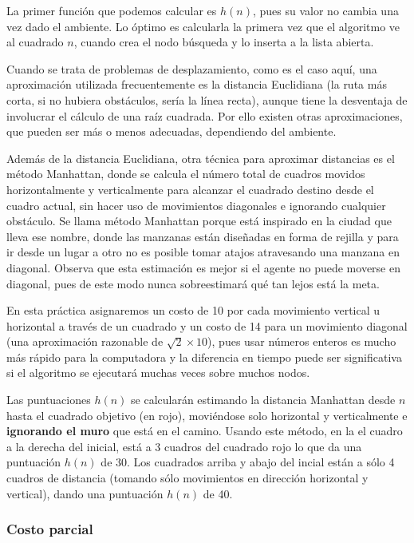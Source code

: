 La primer función que podemos calcular es \(h(n)\), pues su valor no cambia una vez dado el ambiente.  Lo óptimo es calcularla la primera vez que el algoritmo ve al cuadrado \(n\), cuando crea el nodo búsqueda y lo inserta a la lista abierta.

Cuando se trata de problemas de desplazamiento, como es el caso aquí, una aproximación utilizada frecuentemente es la distancia Euclidiana (la ruta más corta, si no hubiera obstáculos, sería la línea recta), aunque tiene la desventaja de involucrar el cálculo de una raíz cuadrada. Por ello existen otras aproximaciones, que pueden ser más o menos adecuadas, dependiendo del ambiente.

Además de la distancia Euclidiana, otra técnica para aproximar distancias es el método Manhattan, donde se calcula el número total de cuadros movidos horizontalmente y verticalmente para alcanzar el cuadrado destino desde el cuadro actual, sin hacer uso de movimientos diagonales e ignorando cualquier obstáculo. Se llama método Manhattan porque está inspirado en la ciudad que lleva ese nombre, donde las manzanas están diseñadas en forma de rejilla y para ir desde un lugar a otro no es posible tomar atajos atravesando una manzana en diagonal.  Observa que esta estimación es mejor si el agente no puede moverse en diagonal, pues de este modo nunca sobreestimará qué tan lejos está la meta.

En esta práctica asignaremos un costo de 10 por cada movimiento vertical u horizontal a través de un cuadrado y un costo de 14 para un movimiento diagonal (una aproximación razonable de \(\sqrt{2}\times10\)), pues usar números enteros es mucho más rápido para la computadora y la diferencia en tiempo puede ser significativa si el algoritmo se ejecutará muchas veces sobre muchos nodos.

Las puntuaciones \(h(n)\) se calcularán estimando la distancia Manhattan desde $n$ hasta el cuadrado objetivo (en rojo), moviéndose solo horizontal y verticalmente e \textbf{ignorando el muro} que está en el camino. Usando este método, en la  el cuadro a la derecha del inicial, está a 3 cuadros del cuadrado rojo lo que da una puntuación \(h(n)\) de 30. Los cuadrados arriba y abajo del incial están a sólo 4 cuadros de distancia (tomando sólo movimientos en dirección horizontal y vertical), dando una puntuación \(h(n)\) de 40.


\subsubsection{Costo parcial}

